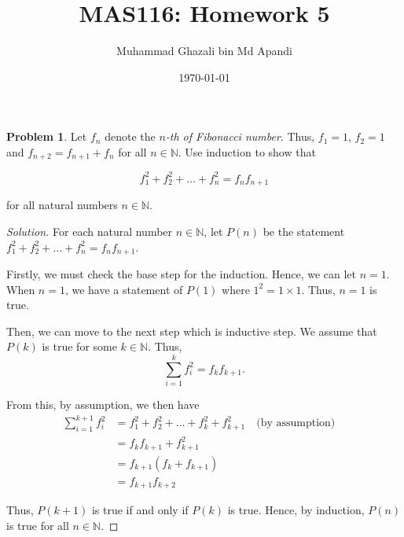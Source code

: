 \documentclass[11pt, a4paper]{amsart}
\title{MAS116: Homework 5}
\author{Muhammad Ghazali bin Md Apandi}
\date{\today}
\theoremstyle{definition}
\newtheorem{problem}{Problem}
\newenvironment{solution}
{\begin{proof}[Solution]}
{\end{proof}}
\begin{document}
\maketitle

\begin{problem}
	Let $f_n$ denote the $n$\emph{-th of Fibonacci number}. Thus, $f_1 = 1$, $f_2 = 1$ and $f_{n+2} = f_{n+1} + f_n$ for all $n \in \mathbb{N}$. Use induction to show that	
	
\[
	f_1^2 + f_2^2 + \ldots +f_n^2 = f_n f_{n+1}
\]

for all natural numbers $n \in \mathbb{N}$.
\end{problem}

\begin{solution}
	For each natural number $n \in \mathbb{N}$, let $P(n)$ be the statement $f_1^2 + f_2^2 + \ldots +f_n^2 = f_n f_{n+1}$.
	
	Firstly, we must check the base step for the induction. Hence, we can let $n = 1$. When $n = 1$, we have a statement of $P(1)$ where $1^2 = 1 \times 1$. Thus, $n = 1$ is true.
	
	Then, we can move to the next step which is inductive step. We assume that $P(k)$ is true for some $k \in \mathbb{N}$. Thus, 
	$$
	\sum_{i=1}^{k} f_i^2 = f_k f_{k+1}.
	$$
	
	From this, by assumption, we then have
	\begin{align*}
	\sum_{i=1}^{k+1} f_i^2 
	&= f_1^2 + f_2^2 + \ldots + f_k^2 + f_{k+1}^2 \quad\text{(by assumption)}\quad \\
	&= f_k f_{k+1} + f_{k+1}^2 \\
	&= f_{k+1}(f_k + f_{k+1})  \\
	&= f_{k+1} f_{k+2}
	\end{align*}
	
	Thus, $P(k+1)$ is true if and only if $P(k)$ is true.
	Hence, by induction, $P(n)$ is true for all $n \in \mathbb{N}$.
\end{solution}
\end{document}

